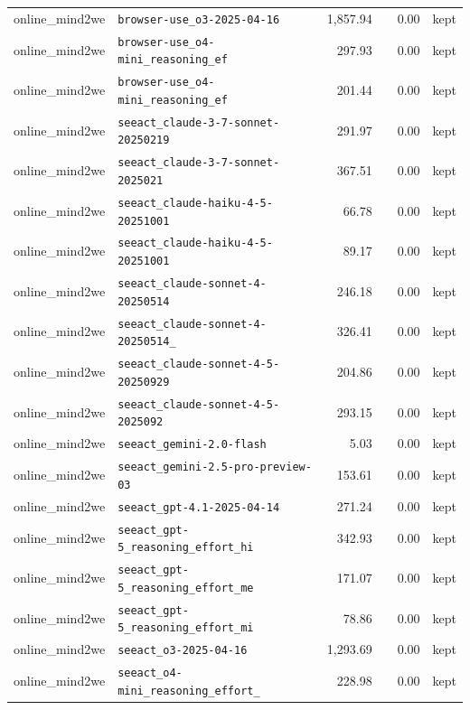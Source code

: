 {\begin{longtable}{llrrrl}
online\_mind2we & \texttt{\scriptsize browser-use\_o3-2025-04-16} & 1,857.94 &  & 0.00 & kept \\
online\_mind2we & \texttt{\scriptsize browser-use\_o4-mini\_reasoning\_ef~} & 297.93 &  & 0.00 & kept \\
online\_mind2we & \texttt{\scriptsize browser-use\_o4-mini\_reasoning\_ef~} & 201.44 &  & 0.00 & kept \\
online\_mind2we & \texttt{\scriptsize seeact\_claude-3-7-sonnet-20250219} & 291.97 &  & 0.00 & kept \\
online\_mind2we & \texttt{\scriptsize seeact\_claude-3-7-sonnet-2025021~} & 367.51 &  & 0.00 & kept \\
online\_mind2we & \texttt{\scriptsize seeact\_claude-haiku-4-5-20251001} & 66.78 &  & 0.00 & kept \\
online\_mind2we & \texttt{\scriptsize seeact\_claude-haiku-4-5-20251001~} & 89.17 &  & 0.00 & kept \\
online\_mind2we & \texttt{\scriptsize seeact\_claude-sonnet-4-20250514} & 246.18 &  & 0.00 & kept \\
online\_mind2we & \texttt{\scriptsize seeact\_claude-sonnet-4-20250514\_~} & 326.41 &  & 0.00 & kept \\
online\_mind2we & \texttt{\scriptsize seeact\_claude-sonnet-4-5-20250929} & 204.86 &  & 0.00 & kept \\
online\_mind2we & \texttt{\scriptsize seeact\_claude-sonnet-4-5-2025092~} & 293.15 &  & 0.00 & kept \\
online\_mind2we & \texttt{\scriptsize seeact\_gemini-2.0-flash} & 5.03 &  & 0.00 & kept \\
online\_mind2we & \texttt{\scriptsize seeact\_gemini-2.5-pro-preview-03~} & 153.61 &  & 0.00 & kept \\
online\_mind2we & \texttt{\scriptsize seeact\_gpt-4.1-2025-04-14} & 271.24 &  & 0.00 & kept \\
online\_mind2we & \texttt{\scriptsize seeact\_gpt-5\_reasoning\_effort\_hi~} & 342.93 &  & 0.00 & kept \\
online\_mind2we & \texttt{\scriptsize seeact\_gpt-5\_reasoning\_effort\_me~} & 171.07 &  & 0.00 & kept \\
online\_mind2we & \texttt{\scriptsize seeact\_gpt-5\_reasoning\_effort\_mi~} & 78.86 &  & 0.00 & kept \\
online\_mind2we & \texttt{\scriptsize seeact\_o3-2025-04-16} & 1,293.69 &  & 0.00 & kept \\
online\_mind2we & \texttt{\scriptsize seeact\_o4-mini\_reasoning\_effort\_~} & 228.98 &  & 0.00 & kept \\

\end{longtable}}
